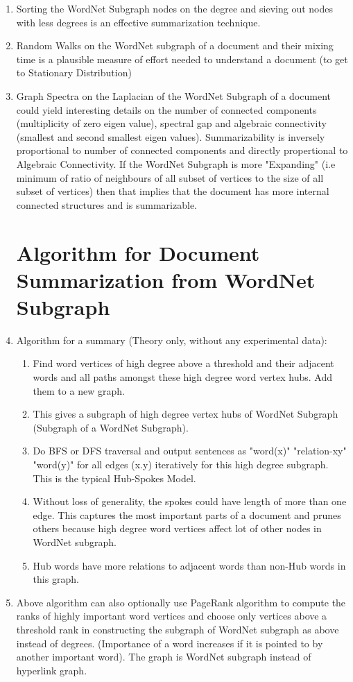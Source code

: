 \documentclass[11pt,onecolumn]{article}
\begin{document}
\begin{enumerate}
\item Sorting the WordNet Subgraph nodes on the degree and sieving out nodes with less degrees is an effective summarization technique.
\item Random Walks on the WordNet subgraph of a document and their mixing time is a plausible measure of effort needed to understand a document (to get to Stationary Distribution)
\item Graph Spectra on the Laplacian of the WordNet Subgraph of a document could yield interesting details on the number of connected components (multiplicity of zero eigen value), spectral gap and algebraic connectivity (smallest and second smallest eigen values). Summarizability is inversely proportional to number of connected components and directly propertional to Algebraic Connectivity. If the WordNet Subgraph is more "Expanding" (i.e minimum of ratio of neighbours of all subset of vertices to the size of all subset of vertices) then that implies that the document has more internal connected structures and is summarizable.

\section {Algorithm for Document Summarization from WordNet Subgraph}

\item Algorithm for a summary (Theory only, without any experimental data): 
\begin{enumerate}
\item Find word vertices of high degree above a threshold and their adjacent words and all paths amongst these high degree word vertex hubs. Add them to a new graph. 
\item This gives a subgraph of high degree vertex hubs of WordNet Subgraph (Subgraph of a WordNet Subgraph). 
\item Do BFS or DFS traversal and output sentences as "word(x)" "relation-xy" "word(y)" for all edges (x.y) iteratively for this high degree subgraph. This is the typical Hub-Spokes Model. 
\item Without loss of generality, the spokes could have length of more than one edge. This captures the most important parts of a document and prunes others because high degree word vertices affect lot of other nodes in WordNet subgraph. 
\item Hub words have more relations to adjacent words than non-Hub words in this graph.
\end{enumerate}
\item Above algorithm can also optionally use PageRank algorithm to compute the ranks of highly important word vertices and choose only vertices above a threshold rank in constructing the subgraph of WordNet subgraph as above instead of degrees. (Importance of a word increases if it is pointed to by another important word). The graph is WordNet subgraph instead of hyperlink graph.


\end{enumerate}
\end{document}

